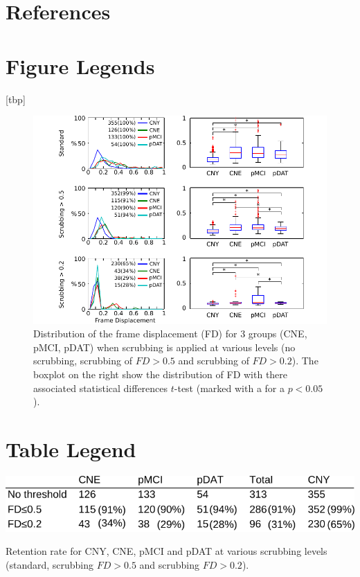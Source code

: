 \documentclass[authoryear]{elsarticle}
\begin{document}
\section*{References}





\pagebreak

\section{Figure Legends}[tbp]
\begin{figure}[!ht]
\begin{center}
\includegraphics[width=\linewidth]{../figures/figure_fd_distrib.pdf}
\end{center}
\caption{
Distribution of the frame displacement (FD) for 3 groups (CNE, pMCI, pDAT) when scrubbing is applied at various levels (no scrubbing, scrubbing of $FD>0.5$ and scrubbing of $FD>0.2$). The boxplot on the right show the distribution of FD with there associated statistical differences $t$-test (marked with a {\bf *} for a $p<0.05$).
}
\label{fig_dist}
\end{figure}





\section{Table Legend}

\begin{table}[tbp]
\begin{center}
\includegraphics[width=0.75\linewidth]{../figures/table_retention.pdf}
\end{center}
\caption{
Retention rate for CNY, CNE, pMCI and pDAT at various scrubbing levels (standard, scrubbing $FD>0.5$ and scrubbing $FD >0.2$).
}
\label{tab_retention}
\end{table}
\end{document}
